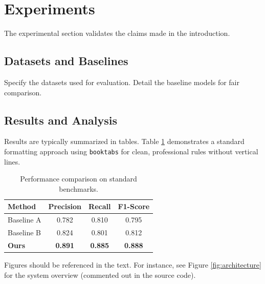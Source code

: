 \section{Experiments}
\label{sec:experiments}

The experimental section validates the claims made in the introduction.

\subsection{Datasets and Baselines}
Specify the datasets used for evaluation. Detail the baseline models for fair comparison.

\subsection{Results and Analysis}

Results are typically summarized in tables. Table \ref{tab:results} demonstrates a standard formatting approach using \texttt{booktabs} for clean, professional rules without vertical lines.

\begin{table}[H]
    \centering
    \caption{Performance comparison on standard benchmarks.}
    \label{tab:results}
    \begin{tabular}{lccc}
        \toprule
        \textbf{Method} & \textbf{Precision} & \textbf{Recall} & \textbf{F1-Score} \\
        \midrule
        Baseline A      & 0.782              & 0.810           & 0.795             \\
        Baseline B      & 0.824              & 0.801           & 0.812             \\
        \textbf{Ours}   & \textbf{0.891}     & \textbf{0.885}  & \textbf{0.888}    \\
        \bottomrule
    \end{tabular}
\end{table}


Figures should be referenced in the text. For instance, see Figure \ref{fig:architecture} for the system overview (commented out in the source code).
